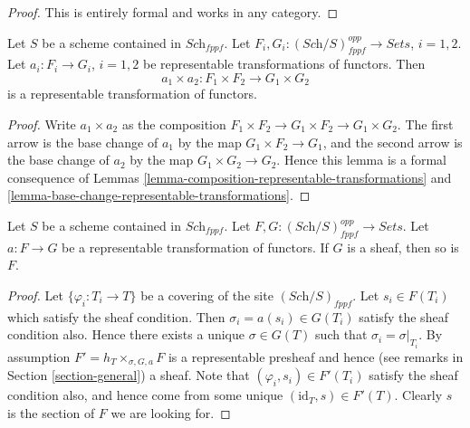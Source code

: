 \begin{proof}
This is entirely formal and works in any category.
\end{proof}

\begin{lemma}
\label{lemma-product-representable-transformations}
Let $S$ be a scheme contained in $\textit{Sch}_{fppf}$.
Let $F_i, G_i : (\textit{Sch}/S)_{fppf}^{opp} \to \textit{Sets}$, $i = 1, 2$.
Let $a_i : F_i \to G_i$, $i = 1, 2$
be representable transformations of functors.
Then
$$
a_1 \times a_2 : F_1 \times F_2 \longrightarrow G_1 \times G_2
$$
is a representable transformation of functors.
\end{lemma}

\begin{proof}
Write $a_1 \times a_2$ as the composition
$F_1 \times F_2 \to G_1 \times F_2 \to G_1 \times G_2$.
The first arrow is the base change of $a_1$ by the map
$G_1 \times F_2 \to G_1$, and the second arrow
is the base change of $a_2$ by the map
$G_1 \times G_2 \to G_2$. Hence this lemma is a formal
consequence of Lemmas \ref{lemma-composition-representable-transformations}
and \ref{lemma-base-change-representable-transformations}.
\end{proof}

\begin{lemma}
\label{lemma-representable-transformation-to-sheaf}
Let $S$ be a scheme contained in $\textit{Sch}_{fppf}$.
Let $F, G : (\textit{Sch}/S)_{fppf}^{opp} \to \textit{Sets}$.
Let $a : F \to G$ be a representable transformation of functors.
If $G$ is a sheaf, then so is $F$.
\end{lemma}

\begin{proof}
Let $\{\varphi_i : T_i \to T\}$ be a covering of the site
$(\textit{Sch}/S)_{fppf}$.
Let $s_i \in F(T_i)$ which satisfy the sheaf condition.
Then $\sigma_i = a(s_i) \in G(T_i)$ satisfy the sheaf condition
also. Hence there exists a unique $\sigma \in G(T)$ such
that $\sigma_i = \sigma|_{T_i}$. By assumption
$F' = h_{T} \times_{\sigma, G, a} F$ is a representable presheaf
and hence (see remarks in Section \ref{section-general}) a sheaf.
Note that $(\varphi_i, s_i) \in F'(T_i)$ satisfy the
sheaf condition also, and hence come from some unique
$(\text{id}_T, s) \in F'(T)$. Clearly $s$ is the section of
$F$ we are looking for.
\end{proof}












